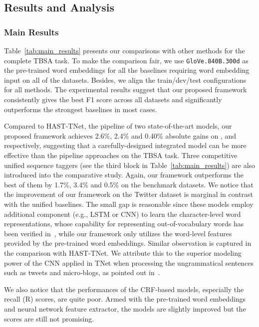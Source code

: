\documentclass[letterpaper]{article} \usepackage{aaai19}  \usepackage{times}  \usepackage{helvet}  \usepackage{courier}  \usepackage{url}  \usepackage{graphicx}  \frenchspacing  \setlength{\pdfpagewidth}{8.5in}  \setlength{\pdfpageheight}{11in}
\begin{document}
\subsection{Results and Analysis}
\subsubsection{Main Results}
Table~\ref{tab:main_results} presents our comparisons with other methods for the complete TBSA task. To
make the comparison fair, we use \texttt{GloVe.840B.300d} as the pre-trained word embeddings for all the baselines requiring word embedding input on all of the datasets. Besides, we align the train/dev/test configurations for all methods. The experimental results suggest that our proposed framework consistently gives the best F1 score across all datasets and significantly outperforms the strongest baselines in most cases.

Compared to HAST-TNet, the pipeline of two state-of-the-art models, our proposed framework achieves 2.6\%, 2.4\% and 0.40\% absolute gains on ,  and  respectively, suggesting that a carefully-designed integrated model can be more effective than the pipeline approaches on the TBSA task. 
Three competitive unified sequence taggers (see the third block in Table~\ref{tab:main_results}) are also introduced into the comparative study. Again, our framework outperforms the best of them by 1.7\%, 3.4\% and 0.5\% on the benchmark datasets. We notice that the improvement of our framework on the Twitter dataset is marginal in contrast with the unified baselines. The small gap is reasonable since these models employ additional component (e.g., LSTM or CNN) to learn the character-level word representations, whose capability for representing out-of-vocabulary words has been verified in~\cite{santos2014learning,kim2016character}, while our framework only utilizes the word-level features provided by the pre-trained word embeddings. Similar observation is captured in the comparison with HAST-TNet. We attribute this to the superior modeling power of the CNN applied in TNet when processing the ungrammatical sentences such as tweets and micro-blogs, as pointed out in~\cite{P18-1087}. 

We also notice that the performances of the CRF-based models, especially the recall (R) scores, are quite poor. Armed with the pre-trained word embeddings and neural network feature extractor, the models are slightly improved but the scores are still not promising. 
\end{document}
